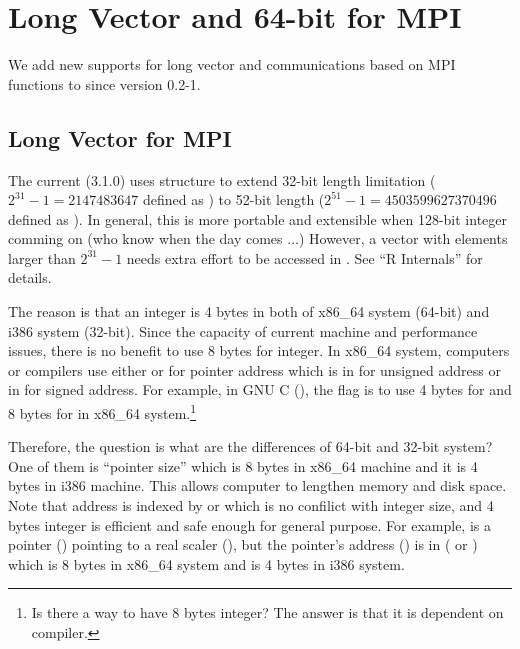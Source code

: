 
\section[Long Vector and 64-bit for MPI]{Long Vector and 64-bit for MPI}
\label{sec:long_vector}

We add new supports for long vector and communications based on MPI functions
to  since version 0.2-1.

\subsection{Long Vector for MPI}
The current  (3.1.0) uses  structure to extend
32-bit length limitation ($2^{31} - 1 = 2147483647$ defined as
) to 52-bit length ($2^{51} - 1 = 4503599627370496$
defined as ).
In general, this is more portable and extensible when 128-bit integer
comming on (who know when the day comes ...)
However, a vector with elements
larger than $2^{31} - 1$ needs extra effort to be accessed in
.
See ``R Internals'' for details.

The reason is that an integer is 4 bytes in both of
x86\_64 system (64-bit) and i386 system (32-bit).
Since the capacity of current machine and performance issues, there is no
benefit to use 8 bytes for integer.
In x86\_64 system, computers or compilers use either  or
 for pointer address which is in  for unsigned
address or in  for signed address.
For example, in GNU C (), the flag  is to
use 4 bytes for  and 8 bytes for 
in x86\_64 system.\footnote{
\color{red}
Is there a way to have 8 bytes integer?
The answer is that it is dependent on compiler.
}

Therefore, the question is what are the differences of 64-bit and
32-bit system? One of them is ``pointer size''
which is 8 bytes in x86\_64 machine and it is 4 bytes in i386 machine.
This allows computer to lengthen memory and disk space.
Note that address is indexed by  or  which is no
confilict with integer size, and 4 bytes integer is efficient and safe enough
for general purpose.
For example,  is a pointer () pointing to a real
scaler (), but the pointer's address () is in
 ( or )
which is 8 bytes in x86\_64 system and is 4 bytes in i386 system.

